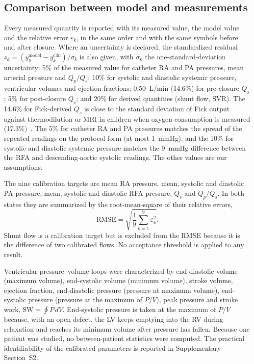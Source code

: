 \FloatBarrier
\subsection{Comparison between model and measurements}
\label{sec:comparison}
\label{sec:statistics}
Every measured quantity is reported with its measured value, the model value and the relative error $\varepsilon_k$, in the same order and with the same symbols before and after closure. Where an uncertainty is declared, the standardized residual $z_k = (y_k^{\mathrm{model}} - y_k^{\mathrm{clin}})/\sigma_k$ is also given, with $\sigma_k$ the one-standard-deviation uncertainty: 5\% of the measured value for catheter RA and PA pressures, mean arterial pressure and $Q_p/Q_s$; 10\% for systolic and diastolic systemic pressure, ventricular volumes and ejection fractions; 0.50~L/min (14.6\%) for pre-closure $Q_s$; 5\% for post-closure $Q_s$; and 20\% for derived quantities (shunt flow, SVR). The 14.6\% for Fick-derived $Q_s$ is close to the standard deviation of Fick output against thermodilution or MRI in children when oxygen consumption is measured (17.3\%)~\cite{Ralston2023}. The 5\% for catheter RA and PA pressures matches the spread of the repeated readings on the protocol form (at most 1~mmHg), and the 10\% for systolic and diastolic systemic pressure matches the 9~mmHg difference between the RFA and descending-aortic systolic readings. The other values are our assumptions.

The nine calibration targets are mean RA pressure, mean, systolic and diastolic PA pressure, mean, systolic and diastolic RFA pressure, $Q_s$ and $Q_p/Q_s$. In both states they are summarized by the root-mean-square of their relative errors,
\begin{equation}
\mathrm{RMSE} = \sqrt{\frac{1}{9}\sum_{k=1}^{9}\varepsilon_k^{2}}.
\label{eq:rmse}
\end{equation}
Shunt flow is a calibration target but is excluded from the RMSE because it is the difference of two calibrated flows. No acceptance threshold is applied to any result.

Ventricular pressure--volume loops were characterized by end-diastolic volume (maximum volume), end-systolic volume (minimum volume), stroke volume, ejection fraction, end-diastolic pressure (pressure at maximum volume), end-systolic pressure (pressure at the maximum of $P/V$), peak pressure and stroke work, $\mathrm{SW} = \oint P\,dV$. End-systolic pressure is taken at the maximum of $P/V$ because, with an open defect, the LV keeps emptying into the RV during relaxation and reaches its minimum volume after pressure has fallen. Because one patient was studied, no between-patient statistics were computed. The practical identifiability of the calibrated parameters is reported in Supplementary Section~S2.

